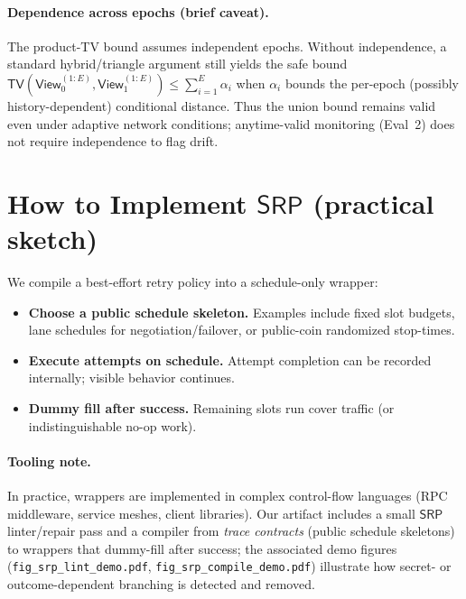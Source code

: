 \documentclass[11pt]{article}
\newcommand{\SRP}{\ensuremath{\mathsf{SRP}}}
\newcommand{\tv}{\ensuremath{\mathsf{TV}}}
\begin{document}
\paragraph{Dependence across epochs (brief caveat).}
The product-TV bound assumes independent epochs.
Without independence, a standard hybrid/triangle argument still yields the safe bound
$\tv(\mathsf{View}_{0}^{(1{:}E)},\mathsf{View}_{1}^{(1{:}E)}) \le \sum_{i=1}^{E}\alpha_i$ when $\alpha_i$ bounds the per-epoch (possibly history-dependent) conditional distance.
Thus the union bound remains valid even under adaptive network conditions; anytime-valid monitoring (Eval~2) does not require independence to flag drift.


\section{How to Implement \texorpdfstring{\SRP}{SRP} (practical sketch)}
We compile a best-effort retry policy into a schedule-only wrapper:
\begin{itemize}[leftmargin=*]
  \item \textbf{Choose a public schedule skeleton.} Examples include fixed slot budgets, lane schedules for negotiation/failover, or public-coin randomized stop-times.
  \item \textbf{Execute attempts on schedule.} Attempt completion can be recorded internally; visible behavior continues.
  \item \textbf{Dummy fill after success.} Remaining slots run cover traffic (or indistinguishable no-op work).
\end{itemize}

\paragraph{Tooling note.}
In practice, wrappers are implemented in complex control-flow languages (RPC middleware, service meshes, client libraries).
Our artifact includes a small \SRP linter/repair pass and a compiler from \emph{trace contracts} (public schedule skeletons) to wrappers that dummy-fill after success;
the associated demo figures (\texttt{fig\_srp\_lint\_demo.pdf}, \texttt{fig\_srp\_compile\_demo.pdf}) illustrate how secret- or outcome-dependent branching is detected and removed.
\end{document}
